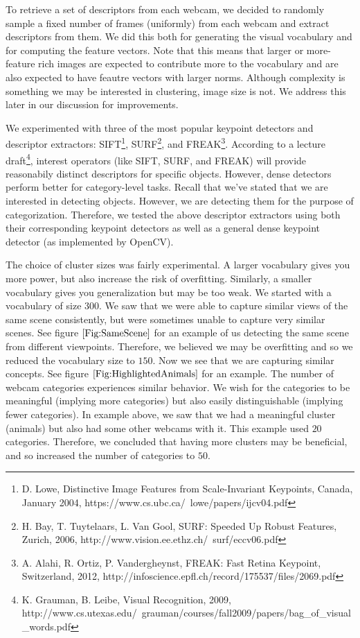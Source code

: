 \documentclass{article}
\begin{document}
To retrieve a set of descriptors from each webcam, we decided to randomly
sample a fixed number of frames (uniformly) from each webcam and extract
descriptors from them. We did this both for generating the visual vocabulary
and for computing the feature vectors. Note that this means that larger or
more-feature rich images are expected to contribute more to the vocabulary and
are also expected to have feautre vectors with larger norms. Although
complexity is something we may be interested in clustering, image size is not.
We address this later in our discussion for improvements.

We experimented with three of the most popular keypoint detectors and
descriptor extractors: SIFT\footnote{D. Lowe, Distinctive Image Features from
  Scale-Invariant Keypoints, Canada, January 2004,
  https://www.cs.ubc.ca/~lowe/papers/ijcv04.pdf}, SURF\footnote{H. Bay, T.
  Tuytelaars, L. Van Gool, SURF: Speeded Up Robust Features,  Zurich, 2006,
  http://www.vision.ee.ethz.ch/~surf/eccv06.pdf}, and FREAK\footnote{A. Alahi,
  R. Ortiz, P. Vandergheynst, FREAK: Fast Retina Keypoint, Switzerland, 2012,
http://infoscience.epfl.ch/record/175537/files/2069.pdf}. According to a
lecture draft\footnote{K. Grauman, B. Leibe, Visual Recognition, 2009,
http://www.cs.utexas.edu/~grauman/courses/fall2009/papers/bag\_of\_visual\_words.pdf},
interest operators (like SIFT, SURF, and FREAK) will provide reasonabily
distinct descriptors for specific objects. However, dense detectors perform
better for category-level tasks. Recall that we've stated that we are
interested in detecting objects. However, we are detecting them for the purpose
of categorization. Therefore, we tested the above descriptor extractors using
both their corresponding keypoint detectors as well as a general dense keypoint
detector (as implemented by OpenCV).

The choice of cluster sizes was fairly experimental. A larger vocabulary gives
you more power, but also increase the risk of overfitting. Similarly, a smaller
vocabulary gives you generalization but may be too weak. We started with a
vocabulary of size $300$. We saw that we were able to capture similar views of
the same scene consistently, but were sometimes unable to capture very similar
scenes. See figure $\ref{Fig:SameScene}$ for an example of us detecting the
same scene from different viewpoints. Therefore, we believed we may be
overfitting and so we reduced the vocabulary size to $150$.  Now we see that we
are capturing similar concepts.  See figure $\ref{Fig:HighlightedAnimals}$ for
an example.  The number of webcam categories experiences similar behavior. We
wish for the categories to be meaningful (implying more categories) but also
easily distinguishable (implying fewer categories). In example above, we saw
that we had a meaningful cluster (animals) but also had some other webcams with
it.  This example used $20$ categories. Therefore, we concluded that having
more clusters may be beneficial, and so increased the number of categories to
$50$.
\end{document}
